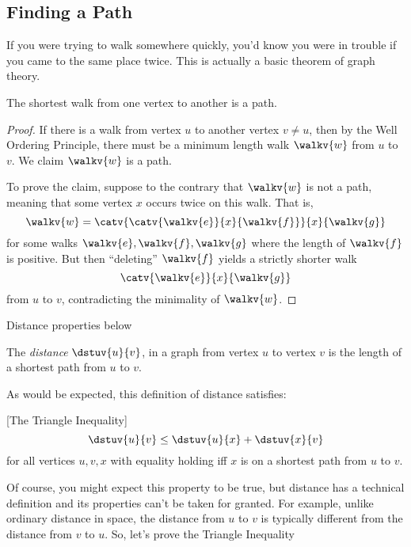 \subsection{Finding a Path}
If you were trying to walk somewhere quickly, you'd know you were in
trouble if you came to the same place twice.  This is actually a basic
theorem of graph theory.

\begin{theorem}\label{shortestwalk_thm}
The shortest walk from one vertex to another is a path.
\end{theorem}

\begin{proof}
  If there is a walk from vertex $u$ to another vertex $v \neq u$,
  then by the Well Ordering Principle, there must be a minimum length
  walk $\walkv{w}$ from $u$ to~$v$.  We claim $\walkv{w}$ is a path.

  To prove the claim, suppose to the contrary that $\walkv{w}$ is not a
  path, meaning that some vertex $x$ occurs twice on this walk.  That is,
\[
\walkv{w} = \catv{\catv{\walkv{e}}{x}{\walkv{f}}}{x}{\walkv{g}}
\]
for some walks $\walkv{e}, \walkv{f}, \walkv{g}$ where the length of
$\walkv{f}$ is positive.  But then ``deleting'' $\walkv{f}$ yields a
strictly shorter walk
\[
\catv{\walkv{e}}{x}{\walkv{g}}
\]
from $u$ to $v$, contradicting the minimality of $\walkv{w}$.
\end{proof}

\iffalse

Actually, we proved something stronger:
\begin{corollary}\label{pathlewalk_cor}
For any walk in a digraph, there is a path starting and ending at the
same vertices as the walk and containing only edges in the walk.  Such
a path is necessarily no longer than the walk.
\end{corollary}
\fi

\begin{editingnotes}
Distance properties below 
\end{editingnotes}

\begin{definition}
  The  \emph{distance}
  $\dstuv{u}{v}$, in a graph from vertex $u$ to vertex $v$ is the
  length of a shortest path from $u$ to $v$.
\end{definition}

As would be expected, this definition of distance satisfies:
\begin{lemma}\label{lem:tri-ineq} [The Triangle Inequality]
\[
\dstuv{u}{v} \leq \dstuv{u}{x} + \dstuv{x}{v}
\]
for all vertices $u,v,x$ with equality holding iff $x$ is on a shortest
path from $u$ to $v$.
\end{lemma}
Of course, you might expect this property to be true, but distance has a
technical definition and its properties can't be taken for granted.
For example, unlike ordinary distance in space, the distance from $u$
to $v$ is typically different from the distance from $v$ to $u$.
So, let's prove the Triangle Inequality

